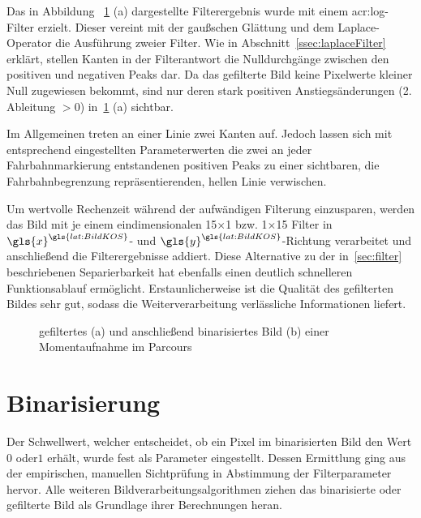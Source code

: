 Das in Abbildung ~\ref{fig:bildvorverarbeitung_filtern} (a) dargestellte Filterergebnis wurde mit einem \gls{acr:log}-Filter erzielt. Dieser vereint mit der gaußschen Glättung und dem Laplace-Operator die Ausführung zweier Filter. Wie in Abschnitt~\ref{ssec:laplaceFilter} erklärt, stellen Kanten in der Filterantwort die Nulldurchgänge zwischen den positiven und negativen Peaks dar. Da das gefilterte Bild keine Pixelwerte kleiner Null zugewiesen bekommt, sind nur deren stark positiven Anstiegsänderungen (2. Ableitung \( > 0\)) in~\ref{fig:bildvorverarbeitung_filtern} (a) sichtbar. 

Im Allgemeinen treten an einer Linie zwei Kanten auf. Jedoch lassen sich mit entsprechend eingestellten Parameterwerten die zwei an jeder Fahrbahnmarkierung entstandenen positiven Peaks zu einer sichtbaren, die Fahrbahnbegrenzung repräsentierenden, hellen Linie verwischen. 

Um wertvolle Rechenzeit während der aufwändigen Filterung einzusparen, werden das Bild mit je einem eindimensionalen 15\( \times \)1 bzw. 1\( \times \)15 Filter in \( {\gls{x}}^{\gls{lat:BildKOS}} \)- und \( {\gls{y}}^{\gls{lat:BildKOS}} \)-Richtung verarbeitet und anschließend die Filterergebnisse addiert. Diese Alternative zu der in~\ref{sec:filter} beschriebenen Separierbarkeit hat ebenfalls einen deutlich schnelleren Funktionsablauf ermöglicht. Erstaunlicherweise ist die Qualität des gefilterten Bildes sehr gut, sodass die Weiterverarbeitung verlässliche Informationen liefert.


\begin{figure}[hb] %
  \centering
  \qquad
  \caption{gefiltertes (a) und anschließend binarisiertes Bild (b) einer Momentaufnahme im Parcours}
\label{fig:bildvorverarbeitung_filtern}
\end{figure} 

\section{Binarisierung}

Der Schwellwert, welcher entscheidet, ob ein Pixel im binarisierten Bild den Wert \glqq \(0\)\grqq{} oder\glqq \(1\)\grqq{} erhält, wurde fest als Parameter eingestellt. Dessen Ermittlung ging aus der empirischen, manuellen Sichtprüfung in Abstimmung der Filterparameter hervor. Alle weiteren Bildverarbeitungsalgorithmen ziehen das binarisierte oder gefilterte Bild als Grundlage ihrer Berechnungen heran.